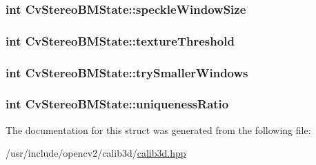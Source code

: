 \hypertarget{structCvStereoBMState_a2c5539336775ae6521a050441a2a547a}{
\subsubsection[{speckle\-Window\-Size}]{\setlength{\rightskip}{0pt plus 5cm}int Cv\-Stereo\-B\-M\-State\-::speckle\-Window\-Size}}\label{structCvStereoBMState_a2c5539336775ae6521a050441a2a547a}
\hypertarget{structCvStereoBMState_af343293b2b824cc268224f27a5865251}{
\subsubsection[{texture\-Threshold}]{\setlength{\rightskip}{0pt plus 5cm}int Cv\-Stereo\-B\-M\-State\-::texture\-Threshold}}\label{structCvStereoBMState_af343293b2b824cc268224f27a5865251}
\hypertarget{structCvStereoBMState_a00d06afb9609f107340d970c936571d9}{
\subsubsection[{try\-Smaller\-Windows}]{\setlength{\rightskip}{0pt plus 5cm}int Cv\-Stereo\-B\-M\-State\-::try\-Smaller\-Windows}}\label{structCvStereoBMState_a00d06afb9609f107340d970c936571d9}
\hypertarget{structCvStereoBMState_a6e34951a7f217bcdea3eadfb21197771}{
\subsubsection[{uniqueness\-Ratio}]{\setlength{\rightskip}{0pt plus 5cm}int Cv\-Stereo\-B\-M\-State\-::uniqueness\-Ratio}}\label{structCvStereoBMState_a6e34951a7f217bcdea3eadfb21197771}


The documentation for this struct was generated from the following file\-:\begin{DoxyCompactItemize}
\item 
/usr/include/opencv2/calib3d/\hyperlink{calib3d_8hpp}{calib3d.\-hpp}\end{DoxyCompactItemize}

